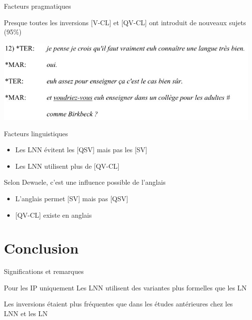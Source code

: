\documentclass{beamer}
\begin{document}
    \begin{frame}{Facteurs pragmatiques}
      \begin{block}{}
        Presque toutes les inversions [V-CL] et [QV-CL] ont introduit de nouveaux sujets (95\%)
      \end{block}
      \includegraphics[scale=0.6]{inversion.jpg}
    \end{frame}

    \begin{frame}{Facteurs linguistiques}
      \begin{block}{}
        \begin{itemize}
          \item Les LNN évitent les [QSV] mais pas les [SV]
          \item Les LNN utilisent plus de [QV-CL]
        \end{itemize}
      \end{block}
      \begin{block}{Selon Dewaele, c'est une influence possible de l'anglais}
        \begin{itemize}
          \item L'anglais permet [SV] mais pas [QSV]
          \item {[}QV-CL] existe en anglais
        \end{itemize}
      \end{block}
    \end{frame}

  \section{Conclusion}
    \begin{frame}{Significations et remarques}
      \begin{block}{Pour les IP uniquement}
        Les LNN utilisent des variantes plus formelles que les LN
      \end{block}
      \begin{block}{}
        Les inversions étaient plus fréquentes que dans les études antérieures chez les LNN et les LN
      \end{block}
    \end{frame}
\end{document}
